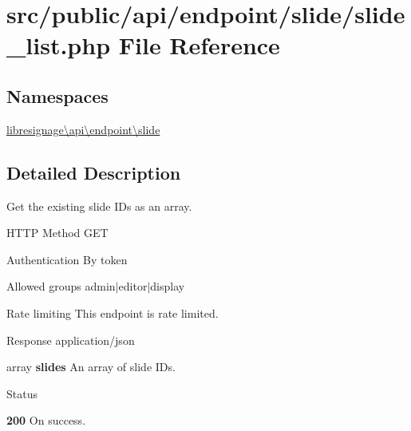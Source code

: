 \hypertarget{src_2public_2api_2endpoint_2slide_2slide__list_8php}{}\section{src/public/api/endpoint/slide/slide\+\_\+list.php File Reference}
\label{src_2public_2api_2endpoint_2slide_2slide__list_8php}
\subsection*{Namespaces}
\begin{DoxyCompactItemize}
\item 
 \hyperlink{namespacelibresignage_1_1api_1_1endpoint_1_1slide}{libresignage\textbackslash{}api\textbackslash{}endpoint\textbackslash{}slide}
\end{DoxyCompactItemize}


\subsection{Detailed Description}
Get the existing slide I\+Ds as an array.

\begin{DoxyParagraph}{H\+T\+TP Method}
G\+ET 
\end{DoxyParagraph}
\begin{DoxyParagraph}{Authentication}
By token 
\end{DoxyParagraph}
\begin{DoxyParagraph}{Allowed groups}
{\ttfamily admin$\vert$editor$\vert$display} 
\end{DoxyParagraph}
\begin{DoxyParagraph}{Rate limiting}
This endpoint is rate limited.
\end{DoxyParagraph}
\begin{DoxyParagraph}{Response}
application/json
\begin{DoxyItemize}
\item {\ttfamily array} {\bfseries slides} An array of slide I\+Ds.
\end{DoxyItemize}
\end{DoxyParagraph}
\begin{DoxyParagraph}{Status}

\begin{DoxyItemize}
\item {\bfseries 200} On success. 
\end{DoxyItemize}
\end{DoxyParagraph}
